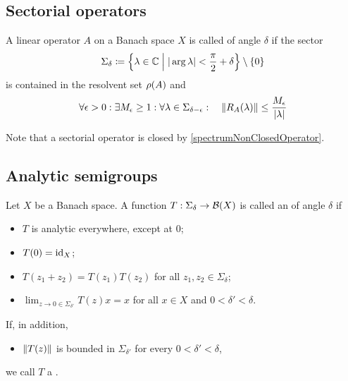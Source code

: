 \subsection{Sectorial operators}
\begin{definition}
A linear operator $A$ on a Banach space $X$ is called  of angle $\delta$ if the sector
\[ \Sigma_\delta \defeq \setbuilder{\lambda\in\C}{|\arg\lambda| < \frac{\pi}{2}+\delta}\setminus \{0\} \]
is contained in the resolvent set $\rho(A)$ and
\[ \forall \epsilon >0: \exists M_\epsilon \geq 1: \forall \lambda\in \Sigma_{\delta-\epsilon}: \quad \lVert R_A(\lambda)\rVert \leq \frac{M_\epsilon}{|\lambda|} \]
\end{definition}
Note that a sectorial operator is closed by \ref{spectrumNonClosedOperator}.

\subsection{Analytic semigroups}
\begin{definition}
Let $X$ be a Banach space. A function $T: \Sigma_\delta \to \operatorname{\mathcal{B}}(X)$ is called an  of angle $\delta$ if
\begin{itemize}
\item $T$ is analytic everywhere, except at $0$;
\item $T(0) = \operatorname{id}_X$;
\item $T(z_1 + z_2) = T(z_1)T(z_2)$ for all $z_1,z_2\in \Sigma_\delta$;
\item $\lim_{z\to 0 \in \Sigma_{\delta'}}T(z)x = x$ for all $x\in X$ and $0<\delta'<\delta$.
\end{itemize}
If, in addition,
\begin{itemize}
\item $\lVert T(z)\rVert$ is bounded in $\Sigma_{\delta'}$ for every $0<\delta'<\delta$,
\end{itemize}
we call $T$ a .
\end{definition}

